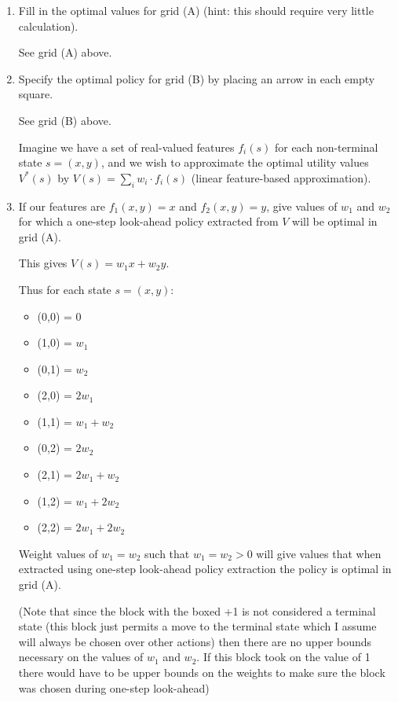 \documentclass[12pt]{article}
\begin{document}
\begin{enumerate}

\item Fill in the optimal values for grid (A) (hint: this should require very little calculation).

  See grid (A) above.

\item  Specify the optimal policy for grid (B) by placing an arrow in each empty square.

  See grid (B) above.

\vspace{0.25in}

  Imagine we have a set of real-valued features $f_i(s)$ for each
  non-terminal state $s = (x, y)$, and we wish to approximate the
  optimal utility values $V^*(s)$ by $V(s) = \sum_i w_i \cdot f_i(s)$
  (linear feature-based approximation).

\item If our features are $f_1(x, y) = x$ and $f_2(x, y) = y$, give
  values of $w_1$ and $w_2$ for which a one-step look-ahead policy extracted
  from $V$ will be optimal in grid (A).

  This gives $V(s) = w_1 x + w_2 y$.

  Thus for each state $s = (x, y)$: 
  \begin{itemize}
    \item (0,0) = $0$
    \item (1,0) = $w_1$
    \item (0,1) = $w_2$
    \item (2,0) = $2 w_1$
    \item (1,1) = $w_1 + w_2$
    \item (0,2) = $2 w_2$
    \item (2,1) = $2 w_1 + w_2$
    \item (1,2) = $w_1 + 2 w_2$
    \item (2,2) = $2 w_1 + 2 w_2$
  \end{itemize}

  Weight values of $w_1 = w_2$ such that $w_1 = w_2 > 0$ will give values that when extracted using one-step look-ahead policy extraction the policy is optimal in grid (A).

  (Note that since the block with the boxed +1 is not considered a terminal state (this block just permits a move to the terminal state which I assume will always be chosen over other actions) then there are no upper bounds necessary on the values of $w_1$ and $w_2$. 
  If this block took on the value of 1 there would have to be upper bounds on the weights to make sure the block was chosen during one-step look-ahead)


\end{enumerate}
\end{document}
